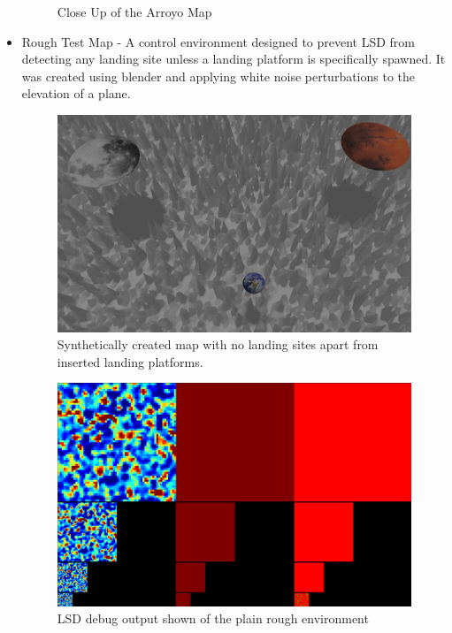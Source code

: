 \begin{itemize}
\begin{figure}[h]
        \caption{Close Up of the Arroyo Map}
        \label{fig:sim_view_arroyo}
    \end{figure}
    \item Rough Test Map - A control environment designed to prevent LSD from detecting any landing site unless a landing platform is specifically spawned. It was created using blender and applying white noise perturbations to the elevation of a plane. 
    \begin{figure}[h]
        \centering
        \includegraphics[scale=0.285]{images/evaluation/rough_test_map.png}
        \caption{Synthetically created map with no landing sites apart from inserted landing platforms.}
    \end{figure}
    \begin{figure}[h]
        \centering
        \includegraphics[scale=0.25]{images/evaluation/rough_map_LSD.png}
        \caption{LSD debug output shown of the plain rough environment}
    \end{figure}

\end{itemize}
